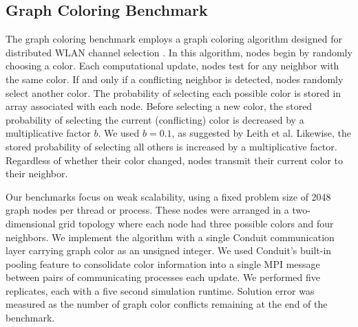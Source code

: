 \subsection{ Graph Coloring Benchmark } \label{sec:graph-coloring-benchmark}

The graph coloring benchmark employs a graph coloring algorithm designed for distributed WLAN channel selection \citep{leith2012wlan}.
In this algorithm, nodes begin by randomly choosing a color.
Each computational update, nodes test for any neighbor with the same color.
If and only if a conflicting neighbor is detected, nodes randomly select another color.
The probability of selecting each possible color is stored in array associated with each node.
Before selecting a new color, the stored probability of selecting the current (conflicting) color is decreased by a multiplicative factor $b$.
We used $b=0.1$, as suggested by Leith et al.
Likewise, the stored probability of selecting all others is increased by a multiplicative factor.
Regardless of whether their color changed, nodes transmit their current color to their neighbor.

Our benchmarks focus on weak scalability, using a fixed problem size of 2048 graph nodes per thread or process.
These nodes were arranged in a two-dimensional grid topology where each node had three possible colors and four neighbors.
We implement the algorithm with a single Conduit communication layer carrying graph color as an unsigned integer.
We used Conduit's built-in pooling feature to consolidate color information into a single MPI message between pairs of communicating processes each update.
We performed five replicates, each with a five second simulation runtime.
Solution error was measured as the number of graph color conflicts remaining at the end of the benchmark.
